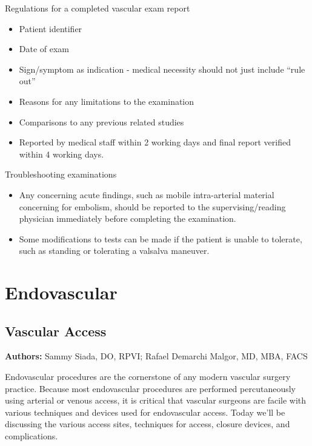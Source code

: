 \documentclass[
]{book}
\begin{document}
Regulations for a completed vascular exam report\citep{iac2021}

\begin{itemize}
\item
  Patient identifier
\item
  Date of exam
\item
  Sign/symptom as indication - medical necessity should not just
  include ``rule out''
\item
  Reasons for any limitations to the examination
\item
  Comparisons to any previous related studies
\item
  Reported by medical staff within 2 working days and final report
  verified within 4 working days.
\end{itemize}

Troubleshooting examinations

\begin{itemize}
\item
  Any concerning acute findings, such as mobile intra-arterial
  material concerning for embolism, should be reported to the
  supervising/reading physician immediately before completing the
  examination.\citep{societyofdiagnosticmedicalsonography2015}
\item
  Some modifications to tests can be made if the patient is unable to
  tolerate, such as standing or tolerating a valsalva
  maneuver.\citep{societyofdiagnosticmedicalsonography2015}
\end{itemize}

\hypertarget{endovascular-2}{%
\chapter{Endovascular}\label{endovascular-2}}

\hypertarget{vascular-access}{%
\section{Vascular Access}\label{vascular-access}}

\textbf{Authors:} Sammy Siada, DO, RPVI; Rafael Demarchi Malgor, MD, MBA,
FACS

Endovascular procedures are the cornerstone of any modern vascular
surgery practice. Because most endovascular procedures are performed
percutaneously using arterial or venous access, it is critical that
vascular surgeons are facile with various techniques and devices used
for endovascular access. Today we'll be discussing the various access
sites, techniques for access, closure devices, and complications.
\end{document}
